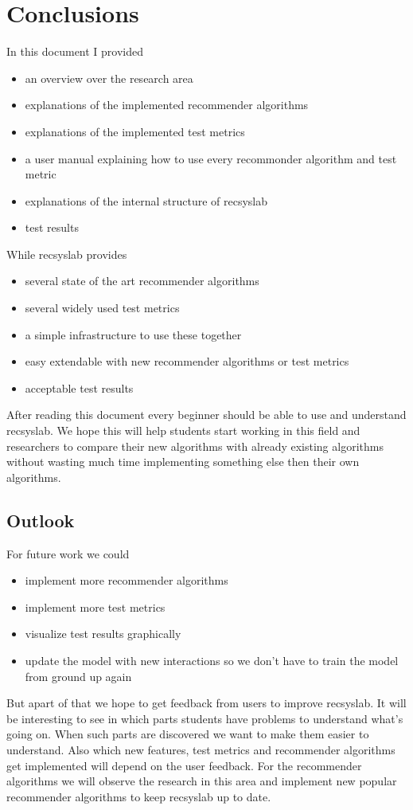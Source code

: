 
\chapter{Conclusions}
In this document I provided
\begin{itemize}
\item an overview over the research area
\item explanations of the implemented recommender algorithms
\item explanations of the implemented test metrics
\item a user manual explaining how to use every recommonder algorithm and test metric
\item explanations of the internal structure of recsyslab
\item test results
\end{itemize}

While recsyslab provides
\begin{itemize}
\item several state of the art recommender algorithms
\item several widely used test metrics
\item a simple infrastructure to use these together
\item easy extendable with new recommender algorithms or test metrics
\item acceptable test results
\end{itemize}
After reading this document every beginner should be able to use and understand recsyslab.
We hope this will help students start working in this field and researchers to compare their new algorithms
with already existing algorithms without wasting much time implementing something else
then their own algorithms.


\section{Outlook}
For future work we could
\begin{itemize}
\item implement more recommender algorithms
\item implement more test metrics
\item visualize test results graphically
\item update the model with new interactions so we don't have to train the model from ground up again
\end{itemize}

But apart of that we hope to get feedback from users to improve recsyslab.
It will be interesting to see in which parts students have problems to 
understand what's going on. When such parts are discovered we want to make
them easier to understand. Also which new features, test metrics and recommender algorithms
get implemented will depend on the user feedback. For the recommender algorithms
we will observe the research in this area and implement new popular recommender algorithms
to keep recsyslab up to date.
